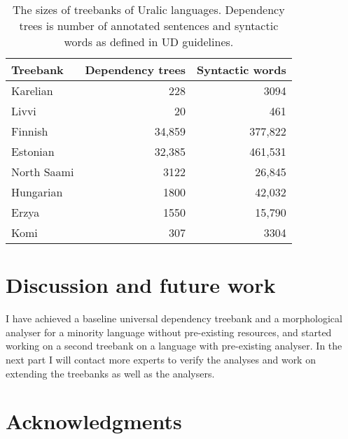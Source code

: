 \documentclass[11pt]{article}
\newif\ifcameraready%
\begin{document}
\begin{table}
    \begin{centering}
    \begin{tabular}{lrr}
        \toprule
        Treebank & Dependency trees & Syntactic words\\
        \midrule
        Karelian & 228 & 3094 \\
        Livvi & 20 & 461 \\
        \midrule
        Finnish & 34,859 & 377,822 \\
        Estonian & 32,385 & 461,531 \\
        North Saami & 3122 & 26,845 \\
        Hungarian & 1800 & 42,032 \\
        Erzya & 1550 & 15,790 \\
        Komi & 307 & 3304 \\
        \bottomrule
    \end{tabular}
    \caption{The sizes of treebanks of Uralic languages.
        Dependency trees is number of annotated sentences and syntactic words
        as defined in UD guidelines.\label{table:stats}}
    \end{centering}
\end{table}

\section{Discussion and future work}
\label{sec:discussion}

I have achieved a baseline universal dependency treebank and a morphological
analyser for a minority language without pre-existing resources, and started
working on a second treebank on a language with pre-existing analyser. In the
next part I will contact more experts to verify the analyses and work on
extending the treebanks as well as the analysers.

\section{Acknowledgments}
\label{sec:acknowledgments}

\ifcameraready%
The author was employed by CLARIN-D during the project.
\fi




\ifcameraready%
\author{Tommi A Pirinen \\
  Universität Hamburg \\
  Max-Brauer-Allee 60 \\
  D-22765, Hamburg  \\
  \texttt{tommi.antero.pirinen@uni-hamburg.de} \\}
  \fi
\end{document}
